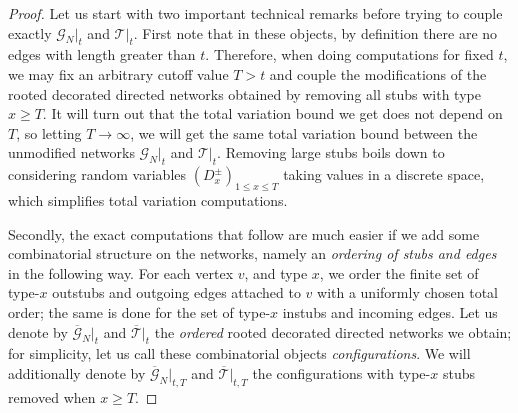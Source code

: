 \begin{refsegment}
\begin{proof}
Let us start with two important technical remarks before trying to
couple exactly $\mathcal{G}_N|_{t}$ and $\mathcal{T}|_{t}$. First
note that in these objects, by definition there are no edges with
length greater than $t$. Therefore, when doing computations for fixed
$t$, we may fix an arbitrary cutoff value $T>t$ and couple the
modifications of the rooted decorated directed networks obtained by
removing all stubs with type $x\geq T$. It will turn out that the total
variation bound we get does not depend on $T$, so letting
$T\to\infty$, we will get the same total variation bound between the
unmodified networks $\mathcal{G}_N|_{t}$ and $\mathcal{T}|_{t}$.
Removing large stubs boils down to considering random variables
$(D^\pm_x)_{1\leq x\leq T}$ taking values in a discrete space,
which simplifies total variation computations.

Secondly, the exact computations that follow are much easier if we add
some combinatorial structure on the networks, namely an \emph{ordering
  of stubs and edges} in the following way. For each vertex $v$, and
type $x$, we order the finite set of type-$x$ outstubs and outgoing
edges attached to $v$ with a uniformly chosen total order; the same is
done for the set of type-$x$ instubs and incoming edges. Let us denote
by $\overline{\mathcal{G}}_N|_{t}$ and
$\overline{\mathcal{T}}|_{t}$ the \emph{ordered} rooted decorated
directed networks we obtain; for simplicity, let us call these
combinatorial objects \emph{configurations}. We will additionally
denote by $\overline{\mathcal{G}}_N|_{t,T}$ and
$\overline{\mathcal{T}}|_{t,T}$ the configurations with type-$x$
stubs removed when $x\geq T$.


\end{proof}
\end{refsegment}

